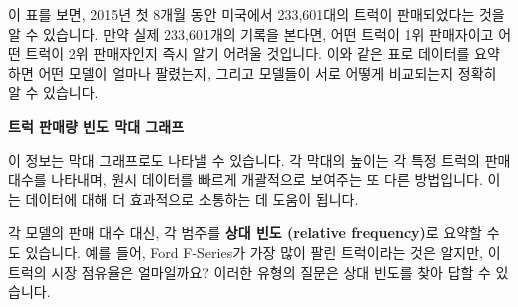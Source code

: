 \documentclass[11pt,a4paper]{book}
\providecommand{\captionof}[2]{\textbf{#2}}
\theoremstyle{definition}
\begin{document}
\begin{examplebox}
이 표를 보면, 2015년 첫 8개월 동안 미국에서 233,601대의 트럭이 판매되었다는 것을 알 수 있습니다. 만약 실제 233,601개의 기록을 본다면, 어떤 트럭이 1위 판매자이고 어떤 트럭이 2위 판매자인지 즉시 알기 어려울 것입니다. 이와 같은 표로 데이터를 요약하면 어떤 모델이 얼마나 팔렸는지, 그리고 모델들이 서로 어떻게 비교되는지 정확히 알 수 있습니다.

\begin{center}
\captionof{figure}{트럭 판매량 빈도 막대 그래프}
\label{fig:bar_graph_count}
\end{center}
이 정보는 막대 그래프로도 나타낼 수 있습니다. 각 막대의 높이는 각 특정 트럭의 판매 대수를 나타내며, 원시 데이터를 빠르게 개괄적으로 보여주는 또 다른 방법입니다. 이는 데이터에 대해 더 효과적으로 소통하는 데 도움이 됩니다.

각 모델의 판매 대수 대신, 각 범주를 \textbf{상대 빈도 (relative frequency)}로 요약할 수도 있습니다. 예를 들어, Ford F-Series가 가장 많이 팔린 트럭이라는 것은 알지만, 이 트럭의 시장 점유율은 얼마일까요? 이러한 유형의 질문은 상대 빈도를 찾아 답할 수 있습니다.
\end{examplebox}
\end{document}

